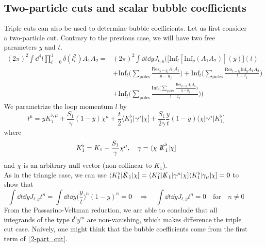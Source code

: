 \subsection*{Two-particle cuts and scalar bubble coefficients}
Triple cuts can also be used to determine bubble coefficients. 
Let us first consider a two-particle cut.
Contrary to the previous case, we will have two free parameters $y$ and $t$.
\begin{equation}\label{2-part_cut}
\begin{split}
(2\pi)^2\int \dd^4 l \prod_{i=0}^1 \delta(l_i^2) A_1 A_2 = & 
(2\pi)^2\int \dd t\dd y J_{t,y}\Big(\big[\mathrm{Inf}_t [\mathrm{Inf}_y(A_1A_2)](y)\big](t) 
\\&
+
\mathrm{Inf}_t\big(\sum_{\textrm{poles}}\frac{\mathrm{Res}_{y = y_i}A_1A_2}{y-y_j})
+
\mathrm{Inf}_t\big(\sum_{\textrm{poles}}\frac{\mathrm{Res}_{t = t_l}\mathrm{Inf}_y A_1A_2}{t-t_l})
\\ &
+
\mathrm{Inf}_t\big(\sum_{\textrm{poles}}\frac{\mathrm{Inf}_t\big(\sum_{\textrm{poles}}\frac{\mathrm{Res}_{y = y_i}A_1A_2}{y-y_j}\big)}{t-t_l}\big)
\Big)
\end{split}
\end{equation}
We parametrize the loop momentum $l$ by
\begin{equation*}
l^\mu = yK_1^{\flat,\mu} + \frac{S_1}{\gamma}(1-y)\chi^\mu + \frac{t}{2}\langle K_1^\flat|\gamma^\mu|\chi] + \frac{S_1}{2\gamma}\frac{y}{t}(1-y)\langle \chi|\gamma^\mu|K_1^\flat]
\end{equation*}
where
\begin{equation*}
K_1^\flat = K_1 - \frac{S_1}{\gamma}\chi^\mu ,\quad
\gamma = \langle \chi | \slashed{K}_1^\flat|\chi]
\end{equation*}
and $\chi$ is an arbitrary null vector (non-collinear to $K_1$).
\\
As in the triangle case, we can use $\langle K_1^\flat| \slashed{K}_1|\chi] = \langle K_1^\flat|\slashed{K}_1 | \gamma^\mu|\chi]\langle K_1^\flat|\gamma_\mu|\chi]= 0$ to show that
\begin{equation*}
\int\dd t\dd y J_{t,y}t^n = \int \dd t \dd y \big(\frac{y}{t}\big)^n(1-y)^n = 0
\quad\Rightarrow\quad
\int \dd t \dd y J_{t,y}t^n = 0
\quad\textrm{for}\quad n\neq 0
\end{equation*} 
From the Passarino-Veltman reduction, we are able to conclude that all integrands of the type $t^0y^m$ are non-vanishing, which makes difference \wrt the triple cut case. 
Naively, one might think that the bubble coefficients come from the first term of~\cref{2-part_cut}.
